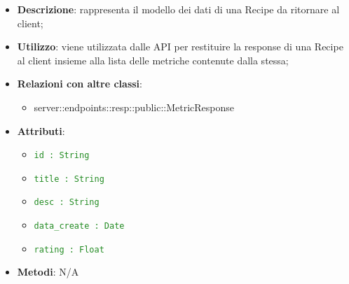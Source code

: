     \begin{itemize}
      \item \textbf{Descrizione}: rappresenta il modello dei dati di una Recipe da ritornare al client;
      \item \textbf{Utilizzo}: viene utilizzata dalle API per restituire la response di una Recipe al client insieme alla lista delle metriche contenute dalla stessa;
      \item \textbf{Relazioni con altre classi}:
        \begin{itemize}
        \item server::endpoints::resp::public::MetricResponse
    \end{itemize}
    \item \textbf{Attributi}:
      \begin{itemize}
        \item \textcolor{forestgreen}{\texttt{id : String}}
        \item \textcolor{forestgreen}{\texttt{title : String}}
        \item \textcolor{forestgreen}{\texttt{desc : String}}
        \item \textcolor{forestgreen}{\texttt{data\_create : Date}}
        \item \textcolor{forestgreen}{\texttt{rating : Float}}
      \end{itemize}
    \item \textbf{Metodi}: N/A
      \end{itemize}


